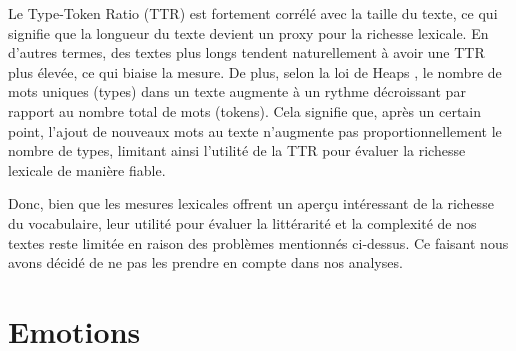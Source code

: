 \documentclass[12pt,a4paper,oneside,titlepage]{book} %
\begin{document}
Le Type-Token Ratio (TTR) est fortement corrélé avec la taille du texte, ce qui signifie que la longueur du texte devient un proxy pour la richesse lexicale. En d'autres termes, des textes plus longs tendent naturellement à avoir une TTR plus élevée, ce qui biaise la mesure. De plus, selon la loi de Heaps , le nombre de mots uniques (types) dans un texte augmente à un rythme décroissant par rapport au nombre total de mots (tokens). Cela signifie que, après un certain point, l'ajout de nouveaux mots au texte n'augmente pas proportionnellement le nombre de types, limitant ainsi l'utilité de la TTR pour évaluer la richesse lexicale de manière fiable. 

Donc, bien que les mesures lexicales offrent un aperçu intéressant de la richesse du vocabulaire, leur utilité pour évaluer la littérarité et la complexité de nos textes reste limitée en raison des problèmes mentionnés ci-dessus. Ce faisant nous avons décidé de ne pas les prendre en compte dans nos analyses.
	
	\section{Emotions}
	
\end{document}
